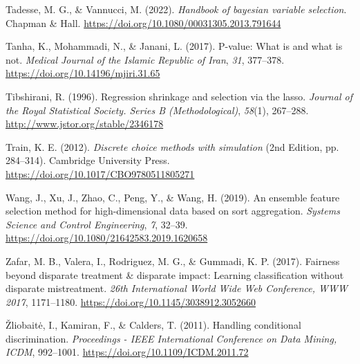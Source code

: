 \documentclass[
  11pt,
]{article}
\newlength{\cslhangindent}
\newlength{\cslentryspacingunit} %
\newenvironment{CSLReferences}[2] %
 {%
  \setlength{\parindent}{0pt}
  \ifodd #1
  \let\oldpar\par
  \def\par{\hangindent=\cslhangindent\oldpar}
  \fi
  \setlength{\parskip}{#2\cslentryspacingunit}
 }%
 {}
\begin{document}
\begin{CSLReferences}{1}{0}
\leavevmode{}%
Tadesse, M. G., \& Vannucci, M. (2022). \emph{Handbook of bayesian
variable selection}. Chapman \& Hall.
\url{https://doi.org/10.1080/00031305.2013.791644}

\leavevmode{}%
Tanha, K., Mohammadi, N., \& Janani, L. (2017). P-value: What is and
what is not. \emph{Medical Journal of the Islamic Republic of Iran},
\emph{31}, 377--378. \url{https://doi.org/10.14196/mjiri.31.65}

\leavevmode{}%
Tibshirani, R. (1996). Regression shrinkage and selection via the lasso.
\emph{Journal of the Royal Statistical Society. Series B
(Methodological)}, \emph{58}(1), 267--288.
\url{http://www.jstor.org/stable/2346178}

\leavevmode{}%
Train, K. E. (2012). \emph{Discrete choice methods with simulation} (2nd
Edition, pp. 284--314). Cambridge University Press.
\url{https://doi.org/10.1017/CBO9780511805271}

\leavevmode{}%
Wang, J., Xu, J., Zhao, C., Peng, Y., \& Wang, H. (2019). An ensemble
feature selection method for high-dimensional data based on sort
aggregation. \emph{Systems Science and Control Engineering}, \emph{7},
32--39. \url{https://doi.org/10.1080/21642583.2019.1620658}

\leavevmode{}%
Zafar, M. B., Valera, I., Rodriguez, M. G., \& Gummadi, K. P. (2017).
Fairness beyond disparate treatment \& disparate impact: Learning
classification without disparate mistreatment. \emph{26th International
World Wide Web Conference, WWW 2017}, 1171--1180.
\url{https://doi.org/10.1145/3038912.3052660}

\leavevmode{}%
Žliobaitė, I., Kamiran, F., \& Calders, T. (2011). Handling conditional
discrimination. \emph{Proceedings - IEEE International Conference on
Data Mining, ICDM}, 992--1001.
\url{https://doi.org/10.1109/ICDM.2011.72}

\end{CSLReferences}
\end{document}
